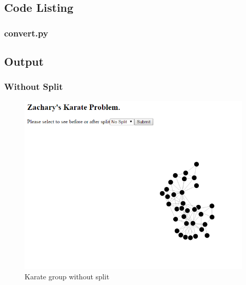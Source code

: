 \documentclass[12pt]{article}
\begin{document}
\subsection{Code Listing}
\subsubsection{convert.py}

\newpage


\subsection{Output}
\subsubsection{Without Split}
\begin{figure}[ht]
\includegraphics[scale=0.4]{../q3/gr3.png}
\centering
\caption{Karate group without split}
\label{Karate group with split}
\end{figure}
\end{document}
